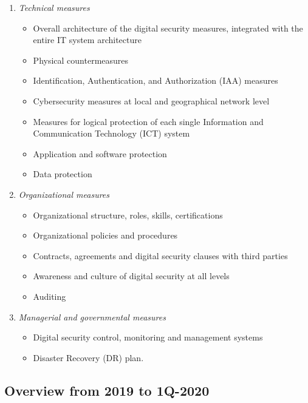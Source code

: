 \documentclass{easychair}
\begin{document}
\begin{enumerate}
\tiny
	\item \emph{Technical measures}
	\begin{itemize}
		\item Overall architecture of the digital security measures, integrated with the entire IT system architecture
		\item Physical countermeasures
		\item Identification, Authentication, and Authorization (IAA) measures
		\item Cybersecurity measures at local and geographical network level
		\item Measures for logical protection of each single Information and Communication Technology (ICT) system
		\item Application and software protection
		\item Data protection
	\end{itemize}
	\item \emph{Organizational measures}
	\begin{itemize}
		\item Organizational structure, roles, skills, certifications
		\item Organizational policies and procedures
		\item Contracts, agreements and digital security clauses with third parties
		\item Awareness and culture of digital security at all levels
		\item Auditing
	\end{itemize}
	\item \emph{Managerial and governmental measures}
	\begin{itemize}
		\item Digital security control, monitoring and management systems
		\item Disaster Recovery (DR) plan.
	\end{itemize}
\end{enumerate}

\subsection{Overview from 2019 to 1Q-2020}
\end{document}
